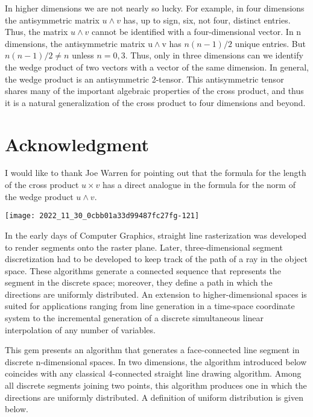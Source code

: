\begin{CJK}{UTF8}{gbsn}
In higher dimensions we are not nearly so lucky. For example, in four dimensions the antisymmetric matrix $u \wedge v$ has, up to sign, six, not four, distinct entries. Thus, the matrix $u \wedge v$ cannot be identified with a four-dimensional vector. In $\mathrm{n}$ dimensions, the antisymmetric matrix $\mathrm{u} \wedge \mathrm{v}$ has $n(n-1) / 2$ unique entries. But $n(n-1) / 2 \neq n$ unless $n=0,3$. Thus, only in three dimensions can we identify the wedge product of two vectors with a vector of the same dimension. In general, the wedge product is an antisymmetric 2-tensor. This antisymmetric tensor shares many of the important algebraic properties of the cross product, and thus it is a natural generalization of the cross product to four dimensions and beyond.

\section{Acknowledgment}
I would like to thank Joe Warren for pointing out that the formula for the length of the cross product $u \times v$ has a direct analogue in the formula for the norm of the wedge product $u \wedge v$.


\begin{center}
\texttt{[image: 2022\_11\_30\_0cbb01a33d99487fc27fg-121]}
\end{center}

In the early days of Computer Graphics, straight line rasterization was developed to render segments onto the raster plane. Later, three-dimensional segment discretization had to be developed to keep track of the path of a ray in the object space. These algorithms generate a connected sequence that represents the segment in the discrete space; moreover, they define a path in which the directions are uniformly distributed. An extension to higher-dimensional spaces is suited for applications ranging from line generation in a time-space coordinate system to the incremental generation of a discrete simultaneous linear interpolation of any number of variables.

This gem presents an algorithm that generates a face-connected line segment in discrete n-dimensional spaces. In two dimensions, the algorithm introduced below coincides with any classical 4-connected straight line drawing algorithm. Among all discrete segments joining two points, this algorithm produces one in which the directions are uniformly distributed. A definition of uniform distribution is given below.


\end{CJK}

